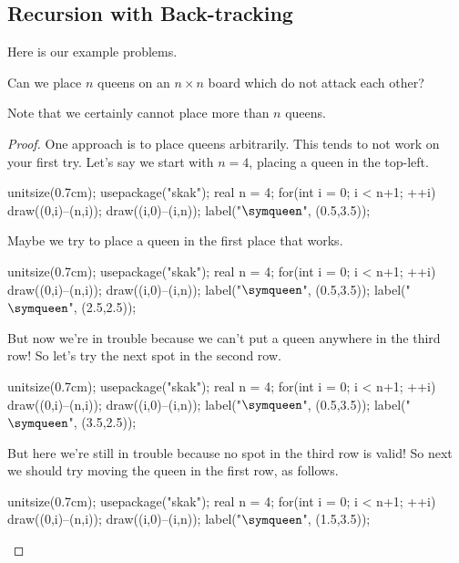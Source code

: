 \documentclass{article}
\begin{document}
\subsection{Recursion with Back-tracking}
Here is our example problems.
\begin{exe}
	Can we place $n$ queens on an $n\times n$ board which do not attack each other?
\end{exe}
Note that we certainly cannot place more than $n$ queens.
\begin{proof}
	One approach is to place queens arbitrarily. This tends to not work on your first try. Let's say we start with $n=4$, placing a queen in the top-left.
	\begin{center}
		\begin{asy}
			unitsize(0.7cm);
			usepackage("skak");
			real n = 4;
			for(int i = 0; i < n+1; ++i)
			{
				draw((0,i)--(n,i));
				draw((i,0)--(i,n));
			}
			label("$\symqueen$", (0.5,3.5));
		\end{asy}
	\end{center}
	Maybe we try to place a queen in the first place that works.
	\begin{center}
		\begin{asy}
			unitsize(0.7cm);
			usepackage("skak");
			real n = 4;
			for(int i = 0; i < n+1; ++i)
			{
				draw((0,i)--(n,i));
				draw((i,0)--(i,n));
			}
			label("$\symqueen$", (0.5,3.5));
			label("$\symqueen$", (2.5,2.5));
		\end{asy}
	\end{center}
	But now we're in trouble because we can't put a queen anywhere in the third row! So let's try the next spot in the second row.
	\begin{center}
		\begin{asy}
			unitsize(0.7cm);
			usepackage("skak");
			real n = 4;
			for(int i = 0; i < n+1; ++i)
			{
				draw((0,i)--(n,i));
				draw((i,0)--(i,n));
			}
			label("$\symqueen$", (0.5,3.5));
			label("$\symqueen$", (3.5,2.5));
		\end{asy}
	\end{center}
	But here we're still in trouble because no spot in the third row is valid! So next we should try moving the queen in the first row, as follows.
	\begin{center}
		\begin{asy}
			unitsize(0.7cm);
			usepackage("skak");
			real n = 4;
			for(int i = 0; i < n+1; ++i)
			{
				draw((0,i)--(n,i));
				draw((i,0)--(i,n));
			}
			label("$\symqueen$", (1.5,3.5));
		\end{asy}

\end{center}
\end{proof}
\end{document}
